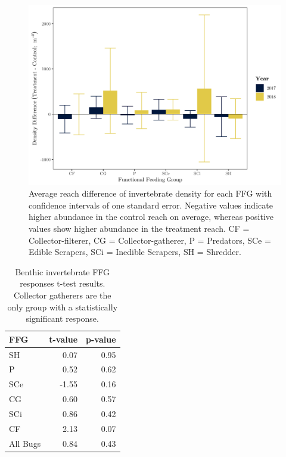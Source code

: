 \documentclass[double,12pt]{beavtex}
\begin{document}
  \begin{figure}
  
  {\centering \includegraphics[width=1\linewidth]{Figures/AvgFFGdiff} 
  
  }
  
  \caption[Average reach difference of invertebrate density for each FFG with confidence intervals of one standard error]{Average reach difference of invertebrate density for each FFG with confidence intervals of one standard error. Negative values indicate higher abundance in the control reach on average, whereas positive values show higher abundance in the treatment reach. CF = Collector-filterer, CG = Collector-gatherer, P = Predators, SCe = Edible Scrapers, SCi = Inedible Scrapers, SH = Shredder.}\label{fig:unnamed-chunk-4}
  \end{figure}
  
  \begin{table}[t]
  
  \caption{\label{tab:ffgtable}Benthic invertebrate FFG responses t-test results. Collector gatherers are the only group with a statistically significant response.}
  \centering
  \begin{tabular}{lrr}
  \toprule
  FFG & t-value & p-value\\
  \midrule
  SH & 0.07 & 0.95\\
  P & 0.52 & 0.62\\
  SCe & -1.55 & 0.16\\
  CG & 0.60 & 0.57\\
  SCi & 0.86 & 0.42\\
  \addlinespace
  CF & 2.13 & 0.07\\
  All Bugs & 0.84 & 0.43\\
  \bottomrule
  \end{tabular}
  \end{table}
  
\end{document}
